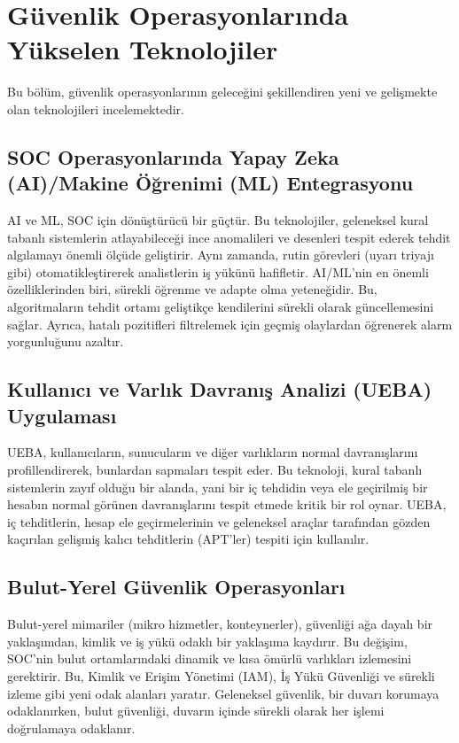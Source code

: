 \section{Güvenlik Operasyonlarında Yükselen Teknolojiler}

Bu bölüm, güvenlik operasyonlarının geleceğini şekillendiren yeni ve gelişmekte olan teknolojileri incelemektedir.

\subsection{SOC Operasyonlarında Yapay Zeka (AI)/Makine Öğrenimi (ML) Entegrasyonu}

AI ve ML, SOC için dönüştürücü bir güçtür. Bu teknolojiler, geleneksel kural tabanlı sistemlerin atlayabileceği ince anomalileri ve desenleri tespit ederek tehdit algılamayı önemli ölçüde geliştirir. Aynı zamanda, rutin görevleri (uyarı triyajı gibi) otomatikleştirerek analistlerin iş yükünü hafifletir. AI/ML'nin en önemli özelliklerinden biri, sürekli öğrenme ve adapte olma yeteneğidir. Bu, algoritmaların tehdit ortamı geliştikçe kendilerini sürekli olarak güncellemesini sağlar. Ayrıca, hatalı pozitifleri filtrelemek için geçmiş olaylardan öğrenerek alarm yorgunluğunu azaltır.

\subsection{Kullanıcı ve Varlık Davranış Analizi (UEBA) Uygulaması}

UEBA, kullanıcıların, sunucuların ve diğer varlıkların normal davranışlarını profillendirerek, bunlardan sapmaları tespit eder. Bu teknoloji, kural tabanlı sistemlerin zayıf olduğu bir alanda, yani bir iç tehdidin veya ele geçirilmiş bir hesabın normal görünen davranışlarını tespit etmede kritik bir rol oynar. UEBA, iç tehditlerin, hesap ele geçirmelerinin ve geleneksel araçlar tarafından gözden kaçırılan gelişmiş kalıcı tehditlerin (APT'ler) tespiti için kullanılır.

\subsection{Bulut-Yerel Güvenlik Operasyonları}

Bulut-yerel mimariler (mikro hizmetler, konteynerler), güvenliği ağa dayalı bir yaklaşımdan, kimlik ve iş yükü odaklı bir yaklaşıma kaydırır. Bu değişim, SOC'nin bulut ortamlarındaki dinamik ve kısa ömürlü varlıkları izlemesini gerektirir. Bu, Kimlik ve Erişim Yönetimi (IAM), İş Yükü Güvenliği ve sürekli izleme gibi yeni odak alanları yaratır. Geleneksel güvenlik, bir duvarı korumaya odaklanırken, bulut güvenliği, duvarın içinde sürekli olarak her işlemi doğrulamaya odaklanır.

